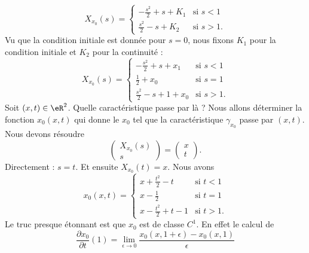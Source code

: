 \begin{example}
\begin{equation}
        X_{x_0}(s)=\begin{cases}
            -\frac{ s^2 }{2}+s+K_1    &   \text{si } s<1\\
            \frac{ s^2 }{2}-s+K_2    &    \text{si } s>1.
        \end{cases}
    \end{equation}
    Vu que la condition initiale est donnée pour \( s=0\), nous fixons \( K_1\) pour la condition initiale et \( K_2\) pour la continuité :
    \begin{equation}
        X_{x_0}(s)=\begin{cases}
            -\frac{ s^2 }{2}+s+x_1   &   \text{si }  s<1\\
            \frac{ 1 }{2}+x_0    &    \text{si } s=1\\
            \frac{ s^2 }{2}-s+1+x_0    &    \text{si } s>1.
        \end{cases}
    \end{equation}
    Soit \( (x,t)\in \eR^2\). Quelle caractéristique passe par là ? Nous allons déterminer la fonction \( x_0(x,t)\) qui donne le \( x_0\) tel que la caractéristique \( \gamma_{x_0}\) passe par \( (x,t)\). Nous devons résoudre
    \begin{equation}
        \begin{pmatrix}
            X_{x_0}(s)    \\
            s
        \end{pmatrix}=\begin{pmatrix}
            x    \\
            t
        \end{pmatrix}.
    \end{equation}
    Directement : \( s=t\). Et ensuite \( X_{x_0}(t)=x\). Nous avons
    \begin{equation}
        x_0(x,t)=\begin{cases}
            x+\frac{ t^2 }{2}-t   &   \text{si } t<1\\
            x-\frac{ 1 }{2}    &    \text{si } t=1\\
            x-\frac{ t^2 }{2}+t-1    &    \text{si } t>1.
        \end{cases}
    \end{equation}
    Le truc presque étonnant est que \( x_0\) est de classe \( C^1\). En effet le calcul de
    \begin{equation}
        \frac{ \partial x_0 }{ \partial t }(1)=\lim_{\epsilon\to 0}\frac{ x_0(x,1+\epsilon)-x_0(x,1) }{ \epsilon }
    \end{equation}

\end{example}
